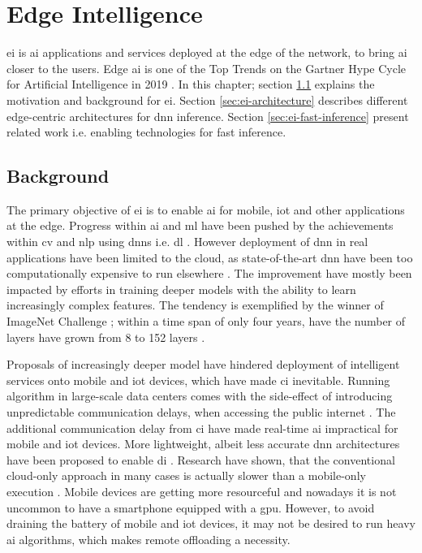 \hypertarget{Edge Intelligence}{%
	\chapter{Edge Intelligence}\label{ch:edgeintelligence}}

\acrfull{ei} is \gls{ai} applications and services deployed at the edge of the network, to bring \gls{ai} closer to the users. Edge \gls{ai} is one of the Top Trends on the Gartner Hype Cycle for Artificial Intelligence in 2019 \cite{goasduff_top_2019}. In this chapter; section \ref{sec:ei-background} explains the motivation and background for \gls{ei}. Section \ref{sec:ei-architecture} describes different edge-centric architectures for \gls{dnn} inference. Section \ref{sec:ei-fast-inference} present related work i.e. enabling technologies for fast inference.

\section{Background}\label{sec:ei-background}

The primary objective of \gls{ei} is to enable \gls{ai} for mobile, \gls{iot} and other applications at the edge. Progress within \gls{ai} and \gls{ml} have been pushed by the achievements within \gls{cv} and \gls{nlp} using \gls{dnn}s i.e. \gls{dl} \cite{stoica_berkeley_2017}. However deployment of \gls{dnn} in real applications have been limited to the cloud, as state-of-the-art \gls{dnn} have been too computationally expensive to run elsewhere \cite{zhou_edge_2019}. The improvement have mostly been impacted by efforts in training deeper models with the ability to learn increasingly complex features. The tendency is exemplified by the winner of ImageNet Challenge ; within a time span of only four years, have the number of layers have grown from 8 to 152 layers \cite{russakovsky_imagenet_2015}. 

Proposals of increasingly deeper model have hindered deployment of intelligent services onto mobile and \gls{iot} devices, which have made \gls{ci} inevitable. Running algorithm in large-scale data centers comes with the side-effect of introducing unpredictable communication delays, when accessing the public internet \cite{shi_edge_2016}. The additional communication delay from \gls{ci} have made real-time \gls{ai} impractical for mobile and \gls{iot} devices. More lightweight, albeit less accurate \gls{dnn} architectures have been proposed to enable \gls{di} \cite{chen_deep_2019}. Research have shown, that the conventional cloud-only approach in many cases is actually slower than a mobile-only execution \cite{kang_neurosurgeon:_2017}. Mobile devices are getting more resourceful and nowadays it is not uncommon to have a smartphone equipped with a \gls{gpu}. However, to avoid draining the battery of mobile and \gls{iot} devices, it may not be desired to run heavy \gls{ai} algorithms, which makes remote offloading a necessity. 

